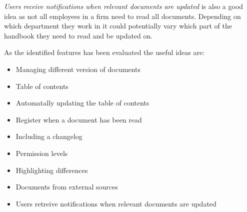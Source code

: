 \textit{Users receive notifications when relevant documents are updated} is also a good idea as not all employees in a firm need to read all documents.
Depending on which department they work in it could potentially vary which part of the handbook they need to read and be updated on.

As the identified features has been evaluated the useful ideas are:
\begin{itemize}
	\item Managing different version of documents
	\item Table of contents
	\item Automatally updating the table of contents
	\item Register when a document has been read
	\item Including a changelog
	\item Permission levels
	\item Highlighting differences
	\item Documents from external sources
	\item Users retreive notifications when relevant documents are updated
\end{itemize}

